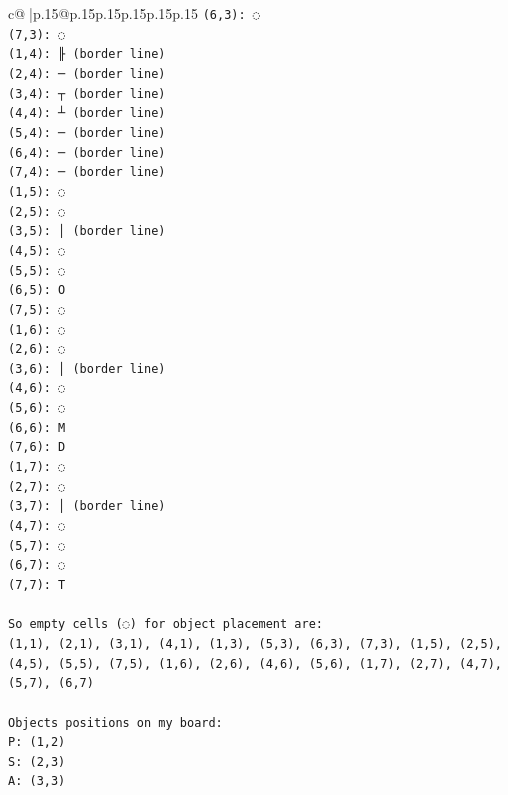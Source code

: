 \documentclass{article}
\begin{document}
{\begin{supertabular}{c@{$\;$}|p{.15\linewidth}@{}p{.15\linewidth}p{.15\linewidth}p{.15\linewidth}p{.15\linewidth}p{.15\linewidth}}
{{{\texttt{(6,3): ◌} \\
\texttt{(7,3): ◌} \\
\texttt{(1,4): ╟ (border line)} \\
\texttt{(2,4): ─ (border line)} \\
\texttt{(3,4): ┬ (border line)} \\
\texttt{(4,4): ┴ (border line)} \\
\texttt{(5,4): ─ (border line)} \\
\texttt{(6,4): ─ (border line)} \\
\texttt{(7,4): ─ (border line)} \\
\texttt{(1,5): ◌} \\
\texttt{(2,5): ◌} \\
\texttt{(3,5): │ (border line)} \\
\texttt{(4,5): ◌} \\
\texttt{(5,5): ◌} \\
\texttt{(6,5): O} \\
\texttt{(7,5): ◌} \\
\texttt{(1,6): ◌} \\
\texttt{(2,6): ◌} \\
\texttt{(3,6): │ (border line)} \\
\texttt{(4,6): ◌} \\
\texttt{(5,6): ◌} \\
\texttt{(6,6): M} \\
\texttt{(7,6): D} \\
\texttt{(1,7): ◌} \\
\texttt{(2,7): ◌} \\
\texttt{(3,7): │ (border line)} \\
\texttt{(4,7): ◌} \\
\texttt{(5,7): ◌} \\
\texttt{(6,7): ◌} \\
\texttt{(7,7): T} \\
\\ 
\texttt{So empty cells (◌) for object placement are:} \\
\texttt{(1,1), (2,1), (3,1), (4,1), (1,3), (5,3), (6,3), (7,3), (1,5), (2,5), (4,5), (5,5), (7,5), (1,6), (2,6), (4,6), (5,6), (1,7), (2,7), (4,7), (5,7), (6,7)} \\
\\ 
\texttt{Objects positions on my board:} \\
\texttt{P: (1,2)} \\
\texttt{S: (2,3)} \\
\texttt{A: (3,3)} \\
}}}
\end{supertabular}}
\end{document}
